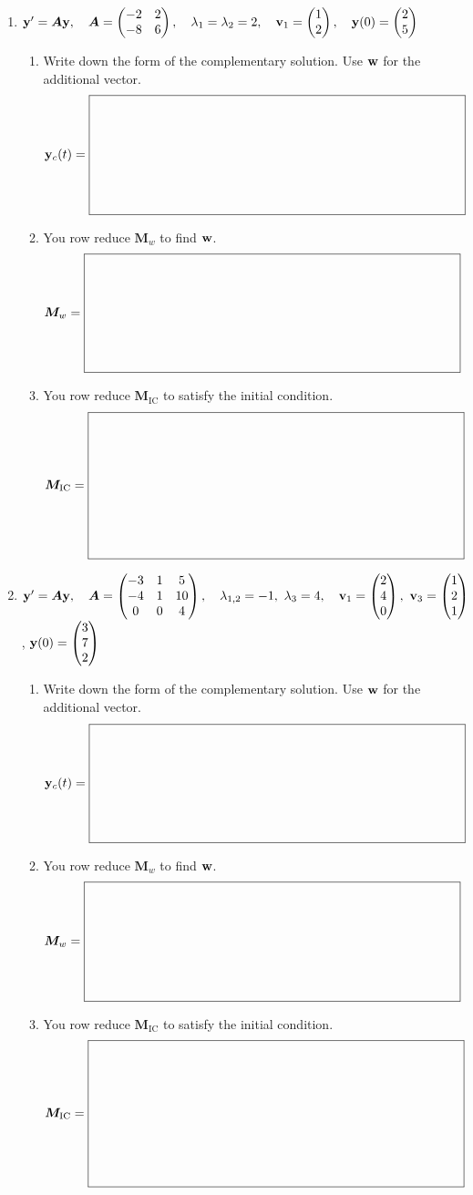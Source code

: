 \documentclass[12pt,letterpaper]{article}
\newcommand{\mat}[1]{\bm{#1}}
\newcommand{\SystemBlank}[2]{%
  \vcenter{\hbox{$\boxed{\rule{0pt}{#2}\makebox[#1]{}}$}}}
\begin{document}
\begin{enumerate}
\item[] \(\vect{y}'=\mat{A}\vect{y},\quad \mat{A}=\begin{pmatrix}-2&2\\-8&6\end{pmatrix},\quad \lambda_1=\lambda_2=2,\quad \vect{v}_1=\begin{pmatrix}1\\2\end{pmatrix},\quad \vect{y}(0)=\begin{pmatrix}2\\5\end{pmatrix}\)

\begin{enumerate}
\item Write down the form of the complementary solution. Use \(\mathbf{w}\) for the
additional vector.
\[
\vect{y}_c(t)=\SystemBlank{4.0in}{1.2in}
\]
\item You row reduce \(\mat{M}_w\) to find \(\mathbf{w}\).
\[
\mat{M}_w=\SystemBlank{4.0in}{1.2in}
\]
\item You row reduce \(\mat{M}_{\mathrm{IC}}\) to satisfy the initial condition.
\[
\mat{M}_{\mathrm{IC}}=\SystemBlank{4.0in}{1.5in}
\]
\end{enumerate}

\newpage
\item[] \(\vect{y}'=\mat{A}\vect{y},\quad \mat{A}=\begin{pmatrix}-3&1&5\\-4&1&10\\0&0&4\end{pmatrix},\quad \lambda_{1,2}=-1,\ \lambda_3=4,\quad \vect{v}_1=\begin{pmatrix}2\\4\\0\end{pmatrix},\ \vect{v}_3=\begin{pmatrix}1\\2\\1\end{pmatrix}\),
\quad 
\(\mathbf{y}(0)=\begin{pmatrix}3\\7\\2\end{pmatrix}\)

\begin{enumerate}
\item Write down the form of the complementary solution. Use \(\mathbf{w}\) for the
additional vector.
\[
\vect{y}_c(t)=\SystemBlank{4.0in}{1.2in}
\]
\item You row reduce \(\mat{M}_w\) to find \(\mathbf{w}\).
\[
\mat{M}_w=\SystemBlank{4.0in}{1.2in}
\]
\item You row reduce \(\mat{M}_{\mathrm{IC}}\) to satisfy the initial condition.
\[
\mat{M}_{\mathrm{IC}}=\SystemBlank{4.0in}{1.5in}
\]
\end{enumerate}
\end{enumerate}
\end{document}
